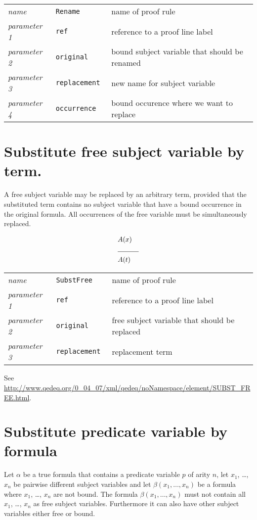 \documentclass[a4paper,german,10pt,twoside]{book}
\theoremstyle{definition}
\theoremstyle{remark}
\begin{document}
\par
\begin{tabularx}{\columnwidth}{lll}
  \emph{name}        & \tt{Rename}      & name of proof rule \\
  \emph{parameter 1} & \tt{ref}         & reference to a proof line label \\
  \emph{parameter 2} & \tt{original}    & bound subject variable that should be renamed \\
  \emph{parameter 3} & \tt{replacement} & new name for subject variable \\
  \emph{parameter 4} & \tt{occurrence}  & bound occurence where we want to replace
\end{tabularx}

\section{Substitute free subject variable by term.} \label{chapter6_section4} \hypertarget{chapter6_section4}{}
A free subject variable may be replaced by an arbitrary term, provided that the substituted term contains no subject variable that have a bound occurrence in the original formula. All occurrences of the free variable must be simultaneously replaced.

\par
\begin{eqnarray*}
 & A(x) & \\
 \cline{2-3}
 & A(t) & \\
\end{eqnarray*}

\par
\begin{tabularx}{\columnwidth}{lll}
  \emph{name}        & \tt{SubstFree}   & name of proof rule \\
  \emph{parameter 1} & \tt{ref}         & reference to a proof line label \\
  \emph{parameter 2} & \tt{original}    & free subject variable that should be replaced \\
  \emph{parameter 3} & \tt{replacement} & replacement term 
\end{tabularx}

\par
See \url{http://www.qedeq.org/0_04_07/xml/qedeq/noNamespace/element/SUBST_FREE.html}.

\section{Substitute predicate variable by formula} \label{chapter6_section5} \hypertarget{chapter6_section5}{}
Let $\alpha$ be a true formula that contains a predicate variable $p$ of arity $n$, let $x_1$, \ldots, $x_n$ be pairwise different subject variables and let $\beta(x_1, \ldots, x_n)$ be a formula where $x_1$, \ldots, $x_n$ are not bound. The formula $\beta(x_1, \ldots, x_n)$ must not contain all $x_1$, \ldots, $x_n$ as free subject variables. Furthermore it can also have other subject variables either free or bound.
\end{document}
